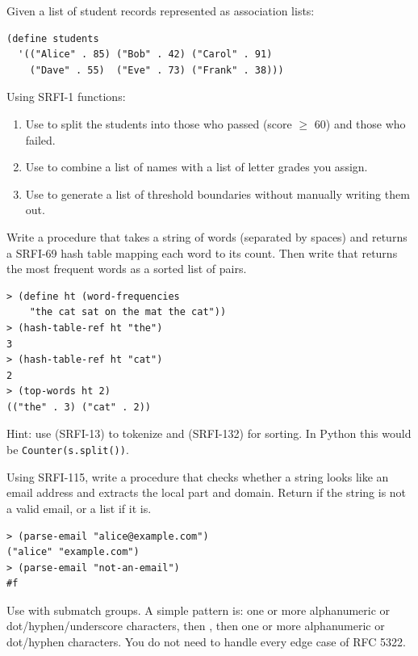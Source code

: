 \begin{exercise}
Given a list of student records represented as association lists:

\begin{lstlisting}
(define students
  '(("Alice" . 85) ("Bob" . 42) ("Carol" . 91)
    ("Dave" . 55)  ("Eve" . 73) ("Frank" . 38)))
\end{lstlisting}

Using SRFI-1 functions:
\begin{enumerate}
    \item Use  to split the students into those who passed (score $\geq$ 60) and those who failed.
    \item Use  to combine a list of names with a list of letter grades you assign.
    \item Use  to generate a list of threshold boundaries  without manually writing them out.
\end{enumerate}
\end{exercise}

\begin{exercise}
Write a procedure  that takes a string of words (separated by spaces) and returns a SRFI-69 hash table mapping each word to its count. Then write  that returns the  most frequent words as a sorted list of  pairs.

\begin{lstlisting}[style=repl]
> (define ht (word-frequencies
    "the cat sat on the mat the cat"))
> (hash-table-ref ht "the")
3
> (hash-table-ref ht "cat")
2
> (top-words ht 2)
(("the" . 3) ("cat" . 2))
\end{lstlisting}

Hint: use  (SRFI-13) to tokenize
and  (SRFI-132) for sorting. In Python
this would be \texttt{Counter(s.split())}.
\end{exercise}

\begin{exercise}
Using SRFI-115, write a procedure  that checks whether a string looks like an email address and extracts the local part and domain. Return  if the string is not a valid email, or a list  if it is.

\begin{lstlisting}[style=repl]
> (parse-email "alice@example.com")
("alice" "example.com")
> (parse-email "not-an-email")
#f
\end{lstlisting}

Use  with submatch groups. A simple pattern is: one or more alphanumeric or dot/hyphen/underscore characters, then , then one or more alphanumeric or dot/hyphen characters. You do not need to handle every edge case of RFC 5322.
\end{exercise}

